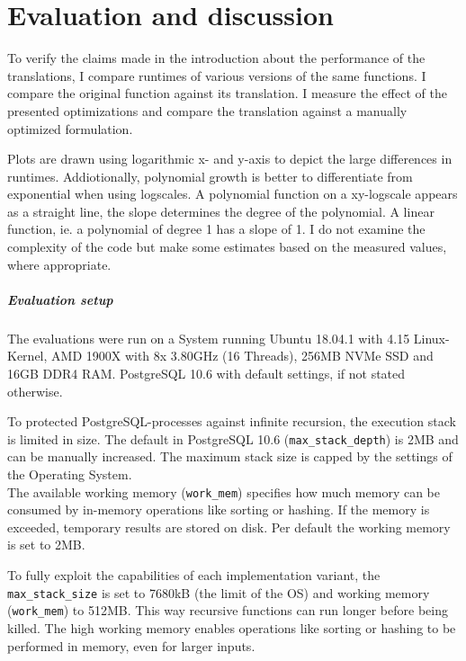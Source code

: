 \chapter{Evaluation and discussion}\label{results_discussion}

To verify the claims made in the introduction about the performance of the translations, I compare runtimes of various versions of the same functions. I compare the original function against its translation. I measure the effect of the presented optimizations and compare the translation against a manually optimized formulation.

Plots are drawn using logarithmic x- and y-axis to depict the large differences in runtimes. Addiotionally, polynomial growth is better to differentiate from exponential when using logscales. A polynomial function on a xy-logscale appears as a straight line, the slope determines the degree of the polynomial. A linear function, ie. a polynomial of degree 1 has a slope of 1. I do not examine the complexity of the code but make some estimates based on the measured values, where appropriate.

\paragraph*{Evaluation setup}
The evaluations were run on a System running Ubuntu 18.04.1 with 4.15 Linux-Kernel, AMD 1900X with 8x 3.80GHz (16 Threads), 256MB NVMe SSD and 16GB DDR4 RAM. PostgreSQL 10.6 with default settings, if not stated otherwise.

To protected PostgreSQL-processes against infinite recursion, the execution stack is limited in size. The default in PostgreSQL 10.6 (\texttt{max\_stack\_depth}) is 2MB and can be manually increased. The maximum stack size is capped by the settings of the Operating System.\\
The available working memory (\texttt{work\_mem}) specifies how much memory can be consumed by in-memory operations like sorting or hashing. If the memory is exceeded, temporary results are stored on disk. Per default the working memory is set to 2MB. \cite[p. 512 ff.]{psql}

To fully exploit the capabilities of each implementation variant, the \texttt{max\_stack\_size} is set to 7680kB (the limit of the OS) and working memory (\texttt{work\_mem}) to 512MB. This way recursive functions can run longer before being killed. The high working memory enables operations like sorting or hashing to be performed in memory, even for larger inputs.

